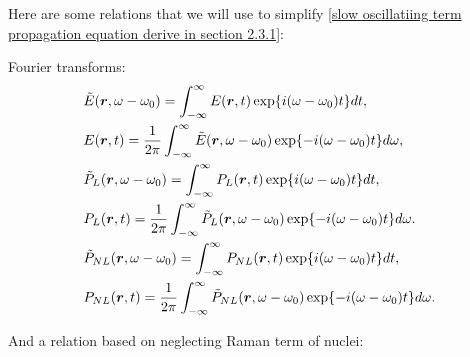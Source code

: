 \documentclass[12pt]{extarticle}
\numberwithin{equation}{section}
\numberwithin{figure}{section}
\numberwithin{table}{section}
\newcommand{\<}{\langle}
\renewcommand{\>}{\rangle}
\theoremstyle{definition}
\newcommand{\SubItem}[1]{
    {\setlength\itemindent{15pt} \item[-] #1}
}
\newcommand{\Lap}{\boldsymbol{\bigtriangledown}}
\begin{document}
\begin{itemize}
                Here are some relations that we will use to simplify \autoref{slow oscillatiing term propagation equation derive in section 2.3.1}:
                    \SubItem{
                    Fourier transforms:
                    \begin{subequations}
                    \begin{align}
                        &\Tilde{E}(\boldsymbol{r},\omega-\omega_0)=\int_{-\infty}^{\infty}E(\boldsymbol{r},t)\exp{i(\omega-\omega_0)t}dt, \label{fourier transform of slow oscillating term of E}\\
                        &E(\boldsymbol{r},t)=\frac{1}{2\pi}\int_{-\infty}^{\infty}\Tilde{E}(\boldsymbol{r},\omega-\omega_0)\exp{-i(\omega-\omega_0)t}d\omega, \label{inverse fourier transform of slow oscillating term of E}\\
                        &\Tilde{P}_L(\boldsymbol{r},\omega-\omega_0)=\int_{-\infty}^{\infty}P_L(\boldsymbol{r},t)\exp{i(\omega-\omega_0)t}dt, \label{fourier transform of slow oscillating term of PL}\\
                        &P_L(\boldsymbol{r},t)=\frac{1}{2\pi}\int_{-\infty}^{\infty}\Tilde{P}_L(\boldsymbol{r},\omega-\omega_0)\exp{-i(\omega-\omega_0)t}d\omega. \label{inverse fourier transform of slow oscillating term of PL}\\
                        &\Tilde{P}_{NL}(\boldsymbol{r},\omega-\omega_0)=\int_{-\infty}^{\infty}P_{NL}(\boldsymbol{r},t)\exp{i(\omega-\omega_0)t}dt, \label{fourier transform of slow oscillating term of PNL}\\
                        &P_{NL}(\boldsymbol{r},t)=\frac{1}{2\pi}\int_{-\infty}^{\infty}\Tilde{P}_{NL}(\boldsymbol{r},\omega-\omega_0)\exp{-i(\omega-\omega_0)t}d\omega. \label{inverse fourier transform of slow oscillating term of PNL}
                    \end{align}
                    \end{subequations}
                    }
                    \SubItem{
                    And a relation based on neglecting Raman term of nuclei:
                    \begin{equation}

\end{equation}}
\end{itemize}
\end{document}
